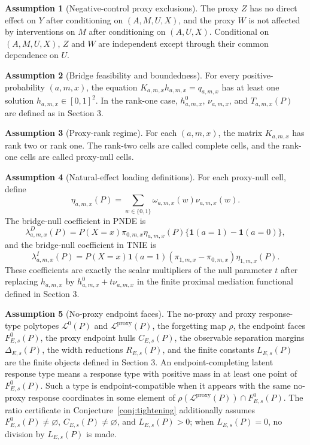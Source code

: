 \documentclass[11pt]{article}
\newcommand{\one}{\mathbf{1}}
\theoremstyle{definition}
\newtheorem{assumption}{Assumption}
\theoremstyle{plain}
\theoremstyle{remark}
\begin{document}
\begin{assumption}[Negative-control proxy exclusions]\label{ass:proxy-exclusion}
The proxy \(Z\) has no direct effect on \(Y\) after conditioning on \((A,M,U,X)\), and the proxy \(W\) is not affected by interventions on \(M\) after conditioning on \((A,U,X)\).  Conditional on \((A,M,U,X)\), \(Z\) and \(W\) are independent except through their common dependence on \(U\).
\end{assumption}

\begin{assumption}[Bridge feasibility and boundedness]\label{ass:bridge}
For every positive-probability \((a,m,x)\), the equation \(K_{a,m,x}h_{a,m,x}=q_{a,m,x}\) has at least one solution \(h_{a,m,x}\in[0,1]^2\).  In the rank-one case, \(h^0_{a,m,x}\), \(\nu_{a,m,x}\), and \(T_{a,m,x}(P)\) are defined as in Section 3.
\end{assumption}

\begin{assumption}[Proxy-rank regime]\label{ass:rank}
For each \((a,m,x)\), the matrix \(K_{a,m,x}\) has rank two or rank one.  The rank-two cells are called complete cells, and the rank-one cells are called proxy-null cells.
\end{assumption}

\begin{assumption}[Natural-effect loading definitions]\label{ass:loadings}
For each proxy-null cell, define
\[
\eta_{a,m,x}(P)=\sum_{w\in\{0,1\}}\omega_{a,m,x}(w)\nu_{a,m,x}(w).
\]
The bridge-null coefficient in PNDE is
\[
\lambda^{D}_{a,m,x}(P)=P(X=x)\pi_{0,m,x}\eta_{a,m,x}(P)\{\one(a=1)-\one(a=0)\},
\]
and the bridge-null coefficient in TNIE is
\[
\lambda^{I}_{a,m,x}(P)=P(X=x)\one(a=1)(\pi_{1,m,x}-\pi_{0,m,x})\eta_{1,m,x}(P).
\]
These coefficients are exactly the scalar multipliers of the null parameter \(t\) after replacing \(h_{a,m,x}\) by \(h^0_{a,m,x}+t\nu_{a,m,x}\) in the finite proximal mediation functional defined in Section 3.
\end{assumption}

\begin{assumption}[No-proxy endpoint faces]\label{ass:endpoint-faces}
The no-proxy and proxy response-type polytopes \(\mathcal L^0(P)\) and \(\mathcal L^{\mathrm{proxy}}(P)\), the forgetting map \(\rho\), the endpoint faces \(F^0_{E,s}(P)\), the proxy endpoint hulls \(C_{E,s}(P)\), the observable separation margins \(\Delta_{E,s}(P)\), the width reductions \(R_{E,s}(P)\), and the finite constants \(L_{E,s}(P)\) are the finite objects defined in Section 3.  An endpoint-completing latent response type means a response type with positive mass in at least one point of \(F^0_{E,s}(P)\).  Such a type is endpoint-compatible when it appears with the same no-proxy response coordinates in some element of \(\rho(\mathcal L^{\mathrm{proxy}}(P))\cap F^0_{E,s}(P)\).  The ratio certificate in Conjecture~\ref{conj:tightening} additionally assumes \(F^0_{E,s}(P)\neq\varnothing\), \(C_{E,s}(P)\neq\varnothing\), and \(L_{E,s}(P)>0\); when \(L_{E,s}(P)=0\), no division by \(L_{E,s}(P)\) is made.
\end{assumption}
\end{document}
